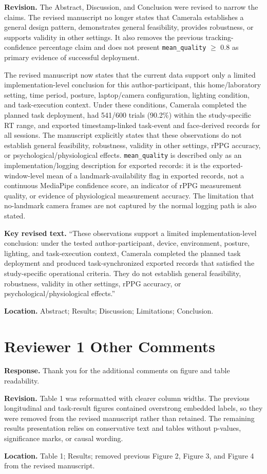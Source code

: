 \documentclass[11pt]{article}
\begin{document}
\textbf{Revision.}
The Abstract, Discussion, and Conclusion were revised to narrow the claims.
The revised manuscript no longer states that Camerala establishes a general design pattern, demonstrates general feasibility, provides robustness, or supports validity in other settings.
It also removes the previous tracking-confidence percentage claim and does not present \texttt{mean\_quality} $\geq$ 0.8 as primary evidence of successful deployment.

The revised manuscript now states that the current data support only a limited implementation-level conclusion for this author-participant, this home/laboratory setting, time period, posture, laptop/camera configuration, lighting condition, and task-execution context.
Under these conditions, Camerala completed the planned task deployment, had 541/600 trials (90.2\%) within the study-specific RT range, and exported timestamp-linked task-event and face-derived records for all sessions.
The manuscript explicitly states that these observations do not establish general feasibility, robustness, validity in other settings, rPPG accuracy, or psychological/physiological effects.
\texttt{mean\_quality} is described only as an implementation/logging description for exported records: it is the exported-window-level mean of a landmark-availability flag in exported records, not a continuous MediaPipe confidence score, an indicator of rPPG measurement quality, or evidence of physiological measurement accuracy.
The limitation that no-landmark camera frames are not captured by the normal logging path is also stated.

\textbf{Key revised text.}
``These observations support a limited implementation-level conclusion: under the tested author-participant, device, environment, posture, lighting, and task-execution context, Camerala completed the planned task deployment and produced task-synchronized exported records that satisfied the study-specific operational criteria. They do not establish general feasibility, robustness, validity in other settings, rPPG accuracy, or psychological/physiological effects.''

\textbf{Location.}
Abstract; Results; Discussion; Limitations; Conclusion.

\section*{Reviewer 1 Other Comments}
\textbf{Response.}
Thank you for the additional comments on figure and table readability.

\textbf{Revision.}
Table 1 was reformatted with clearer column widths.
The previous longitudinal and task-result figures contained overstrong embedded labels, so they were removed from the revised manuscript rather than retained.
The remaining results presentation relies on conservative text and tables without p-values, significance marks, or causal wording.

\textbf{Location.}
Table 1; Results; removed previous Figure 2, Figure 3, and Figure 4 from the revised manuscript.
\end{document}
